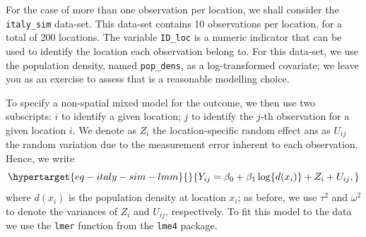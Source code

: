 \documentclass[
  letterpaper,
]{krantz}
\begin{document}
For the case of more than one observation per location, we shall
consider the \texttt{italy\_sim} data-set. This data-set contains 10
observations per location, for a total of 200 locations. The variable
\texttt{ID\_loc} is a numeric indicator that can be used to identify the
location each observation belong to. For this data-set, we use the
population density, named \texttt{pop\_dens}, as a log-transformed
covariate; we leave you as an exercise to assess that is a reasonable
modelling choice.

To specify a non-spatial mixed model for the outcome, we then use two
subscripts: \(i\) to identify a given location; \(j\) to identify the
\(j\)-th observation for a given location \(i\). We denote as \(Z_i\)
the location-specific random effect ans as \(U_{ij}\) the random
variation due to the measurement error inherent to each observation.
Hence, we write
\begin{equation}\protect\hypertarget{eq-italy-sim-lmm}{}{
Y_{ij} = \beta_0 + \beta_1 \log\{d(x_i)\} + Z_i + U_{ij},
}\label{eq-italy-sim-lmm}\end{equation} where \(d(x_i)\) is the
population density at location \(x_i\); as before, we use \(\tau^2\) and
\(\omega^2\) to denote the variances of \(Z_i\) and \(U_{ij}\),
respectively. To fit this model to the data we use the \texttt{lmer}
function from the \texttt{lme4} package.
\end{document}

